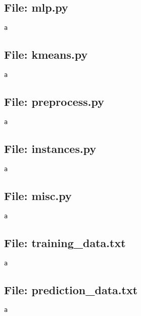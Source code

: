 \documentclass{article}
\begin{document}
\subsection*{File: mlp.py}
\begin{verbatim}
a
\end{verbatim}

\subsection*{File: kmeans.py}
\begin{verbatim}
a
\end{verbatim}

\subsection*{File: preprocess.py}
\begin{verbatim}
a
\end{verbatim}

\subsection*{File: instances.py}
\begin{verbatim}
a
\end{verbatim}

\subsection*{File: misc.py}
\begin{verbatim}
a
\end{verbatim}

\subsection*{File: training\_data.txt}
\begin{verbatim}
a
\end{verbatim}

\subsection*{File: prediction\_data.txt}
\begin{verbatim}
a
\end{verbatim}
\end{document}
